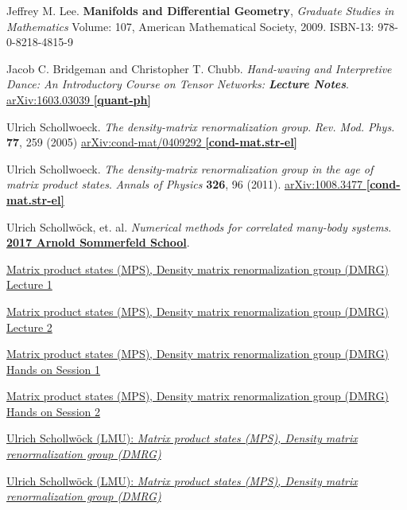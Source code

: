\documentclass[10pt]{amsart}
\begin{document}
\begin{thebibliography}{9}
Jeffrey M. Lee. \textbf{Manifolds and Differential Geometry}, \emph{Graduate Studies in Mathematics} Volume: 107, American Mathematical Society, 2009. ISBN-13: 978-0-8218-4815-9

Jacob C. Bridgeman and Christopher T. Chubb.  \emph{Hand-waving and Interpretive Dance: An Introductory Course on Tensor Networks: \textbf{Lecture Notes}}.  \href{https://arxiv.org/abs/1603.03039}{arXiv:1603.03039 \textbf{[quant-ph]}}

Ulrich Schollwoeck.  \emph{The density-matrix renormalization group}.   \emph{Rev. Mod. Phys.} \textbf{77}, 259 (2005)	\href{https://arxiv.org/abs/cond-mat/0409292}{arXiv:cond-mat/0409292 \textbf{[cond-mat.str-el]}}

Ulrich Schollwoeck.  \emph{The density-matrix renormalization group in the age of matrix product states}.  \emph{Annals of Physics} \textbf{326}, 96 (2011).  \href{https://arxiv.org/abs/1008.3477}{arXiv:1008.3477 \textbf{[cond-mat.str-el]}}

Ulrich Schollw\"{o}ck, et. al. \emph{Numerical methods for correlated many-body systems}. \href{https://www.asc.physik.lmu.de/activities/schools/archiv/asc_school_17/index.html}{\textbf{2017 Arnold Sommerfeld School}}. 

\href{https://cast.itunes.uni-muenchen.de/clips/WE0Gf4L6f3/vod/high_quality.mp4}{Matrix product states (MPS), Density matrix renormalization group (DMRG) Lecture 1} 

\href{https://cast.itunes.uni-muenchen.de/clips/1PTFIT1n42/vod/high_quality.mp4}{Matrix product states (MPS), Density matrix renormalization group (DMRG) Lecture 2} 

\href{https://cast.itunes.uni-muenchen.de/clips/uN8yxWC8m9/vod/high_quality.mp4}{Matrix product states (MPS), Density matrix renormalization group (DMRG) Hands on Session 1} 

\href{https://cast.itunes.uni-muenchen.de/clips/xJRe4DD7Fo/vod/high_quality.mp4}{Matrix product states (MPS), Density matrix renormalization group (DMRG) Hands on Session 2} 

\href{https://www.asc.physik.lmu.de/activities/schools/archiv/asc_school_17/extramaterial/schollwoeck_asc_1.pdf}{Ulrich Schollw\"{o}ck (LMU): \emph{Matrix product states (MPS), Density matrix renormalization group (DMRG)}}

\href{https://www.asc.physik.lmu.de/activities/schools/archiv/asc_school_17/extramaterial/schollwoeck_asc_2.pdf}{Ulrich Schollw\"{o}ck (LMU): \emph{Matrix product states (MPS), Density matrix renormalization group (DMRG)}}



\end{thebibliography}
\end{document}
